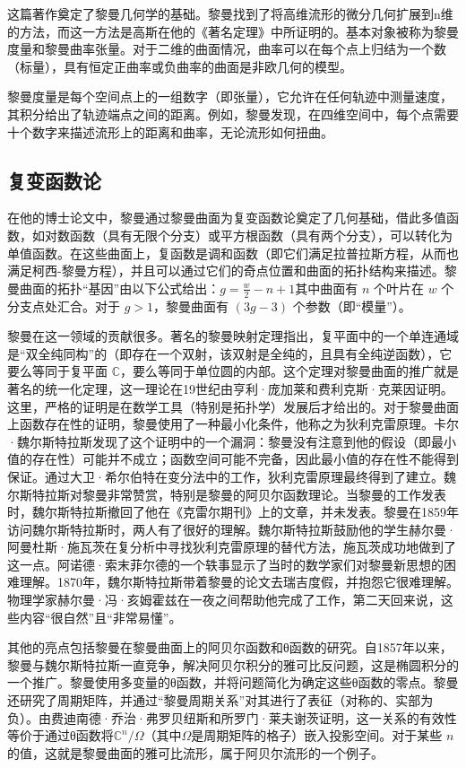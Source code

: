 这篇著作奠定了黎曼几何学的基础。黎曼找到了将高维流形的微分几何扩展到n维的方法，而这一方法是高斯在他的《著名定理》中所证明的。基本对象被称为黎曼度量和黎曼曲率张量。对于二维的曲面情况，曲率可以在每个点上归结为一个数（标量），具有恒定正曲率或负曲率的曲面是非欧几何的模型。

黎曼度量是每个空间点上的一组数字（即张量），它允许在任何轨迹中测量速度，其积分给出了轨迹端点之间的距离。例如，黎曼发现，在四维空间中，每个点需要十个数字来描述流形上的距离和曲率，无论流形如何扭曲。
\subsection{复变函数论}
在他的博士论文中，黎曼通过黎曼曲面为复变函数论奠定了几何基础，借此多值函数，如对数函数（具有无限个分支）或平方根函数（具有两个分支），可以转化为单值函数。在这些曲面上，复函数是调和函数（即它们满足拉普拉斯方程，从而也满足柯西-黎曼方程），并且可以通过它们的奇点位置和曲面的拓扑结构来描述。黎曼曲面的拓扑“基因”由以下公式给出：\(g = \frac{w}{2} - n + 1\)其中曲面有 \(n\) 个叶片在 \(w\) 个分支点处汇合。对于 \(g > 1\)，黎曼曲面有 \((3g - 3)\) 个参数（即“模量”）。

黎曼在这一领域的贡献很多。著名的黎曼映射定理指出，复平面中的一个单连通域是“双全纯同构”的（即存在一个双射，该双射是全纯的，且具有全纯逆函数），它要么等同于复平面 \(\mathbb{C}\)，要么等同于单位圆的内部。这个定理对黎曼曲面的推广就是著名的统一化定理，这一理论在19世纪由亨利·庞加莱和费利克斯·克莱因证明。这里，严格的证明是在数学工具（特别是拓扑学）发展后才给出的。对于黎曼曲面上函数存在性的证明，黎曼使用了一种最小化条件，他称之为狄利克雷原理。卡尔·魏尔斯特拉斯发现了这个证明中的一个漏洞：黎曼没有注意到他的假设（即最小值的存在性）可能并不成立；函数空间可能不完备，因此最小值的存在性不能得到保证。通过大卫·希尔伯特在变分法中的工作，狄利克雷原理最终得到了建立。魏尔斯特拉斯对黎曼非常赞赏，特别是黎曼的阿贝尔函数理论。当黎曼的工作发表时，魏尔斯特拉斯撤回了他在《克雷尔期刊》上的文章，并未发表。黎曼在1859年访问魏尔斯特拉斯时，两人有了很好的理解。魏尔斯特拉斯鼓励他的学生赫尔曼·阿曼杜斯·施瓦茨在复分析中寻找狄利克雷原理的替代方法，施瓦茨成功地做到了这一点。阿诺德·索末菲尔德的一个轶事显示了当时的数学家们对黎曼新思想的困难理解。1870年，魏尔斯特拉斯带着黎曼的论文去瑞吉度假，并抱怨它很难理解。物理学家赫尔曼·冯·亥姆霍兹在一夜之间帮助他完成了工作，第二天回来说，这些内容“很自然”且“非常易懂”。

其他的亮点包括黎曼在黎曼曲面上的阿贝尔函数和θ函数的研究。自1857年以来，黎曼与魏尔斯特拉斯一直竞争，解决阿贝尔积分的雅可比反问题，这是椭圆积分的一个推广。黎曼使用多变量的θ函数，并将问题简化为确定这些θ函数的零点。黎曼还研究了周期矩阵，并通过“黎曼周期关系”对其进行了表征（对称的、实部为负）。由费迪南德·乔治·弗罗贝纽斯和所罗门·莱夫谢茨证明，这一关系的有效性等价于通过θ函数将\(\mathbb{C}^n/\Omega\)（其中\(\Omega\)是周期矩阵的格子）嵌入投影空间。对于某些 \(n\) 的值，这就是黎曼曲面的雅可比流形，属于阿贝尔流形的一个例子。

